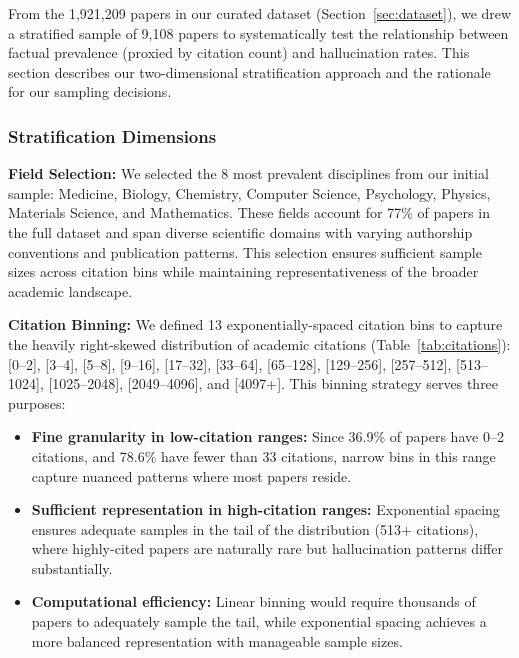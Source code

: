 \documentclass[11pt]{article}
\begin{document}
From the 1,921,209 papers in our curated dataset (Section~\ref{sec:dataset}), we drew a stratified sample of 9,108 papers to systematically test the relationship between factual prevalence (proxied by citation count) and hallucination rates. This section describes our two-dimensional stratification approach and the rationale for our sampling decisions.

\subsubsection{Stratification Dimensions}

\textbf{Field Selection:} We selected the 8 most prevalent disciplines from our initial sample: Medicine, Biology, Chemistry, Computer Science, Psychology, Physics, Materials Science, and Mathematics. These fields account for 77\% of papers in the full dataset and span diverse scientific domains with varying authorship conventions and publication patterns. This selection ensures sufficient sample sizes across citation bins while maintaining representativeness of the broader academic landscape.

\noindent \textbf{Citation Binning:} We defined 13 exponentially-spaced citation bins to capture the heavily right-skewed distribution of academic citations (Table~\ref{tab:citations}): [0--2], [3--4], [5--8], [9--16], [17--32], [33--64], [65--128], [129--256], [257--512], [513--1024], [1025--2048], [2049--4096], and [4097+]. This binning strategy serves three purposes:

\begin{itemize}[
   leftmargin=1em,
    itemsep=0.2em,
    topsep=0.2em,
    partopsep=0em,
    parsep=0em
]
\item \textbf{Fine granularity in low-citation ranges:} Since 36.9\% of papers have 0--2 citations, and 78.6\% have fewer than 33 citations, narrow bins in this range capture nuanced patterns where most papers reside.

\item \textbf{Sufficient representation in high-citation ranges:} Exponential spacing ensures adequate samples in the tail of the distribution (513+ citations), where highly-cited papers are naturally rare but hallucination patterns differ substantially.

\item \textbf{Computational efficiency:} Linear binning would require thousands of papers to adequately sample the tail, while exponential spacing achieves a more balanced representation with manageable sample sizes.
\end{itemize}
\end{document}

